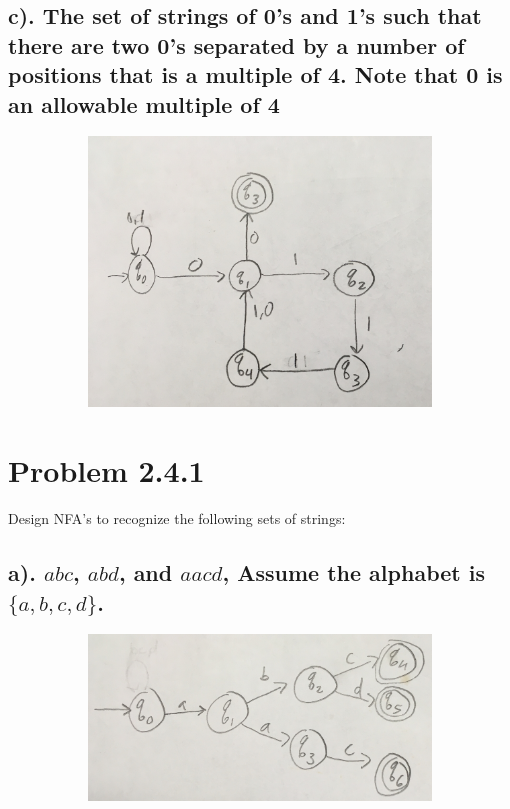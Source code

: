 \documentclass[20pt]{article} %
\begin{document}
\subsection{c). The set of strings of 0's and 1's such that there are two 0's separated by a number of positions that is a multiple of 4. Note that 0 is an allowable multiple of 4}
\begin{figure}[!htbp]
  	\centering
   	\begin{subfigure}[p]{0.7\linewidth}
    	\includegraphics[width=\linewidth]{./figures/h2-5.jpg}
   	\end{subfigure}
\end{figure}


\section{Problem 2.4.1}
Design NFA's to recognize the following sets of strings:

\subsection{a). $abc$, $abd$, and $aacd$, Assume the alphabet is $\{a,b,c,d\}$.}
\begin{figure}[!htbp]
  	\centering
   	\begin{subfigure}[p]{0.7\linewidth}
    	\includegraphics[width=\linewidth]{./figures/h2-6.jpg}
   	\end{subfigure}
\end{figure}
\newpage
\end{document}
